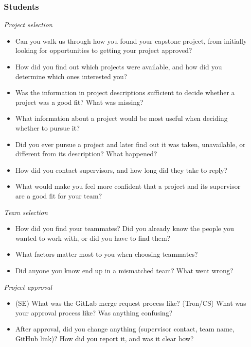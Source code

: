 \documentclass{article}
\begin{document}
    \subsubsection*{Students}
    \textit{Project selection}
    \begin{itemize}
        \item Can you walk us through how you found your capstone project, from initially looking for opportunities to getting your project approved?
        \item How did you find out which projects were available, and how did you determine which ones interested you?
        \item Was the information in project descriptions sufficient to decide whether a project was a good fit? What was missing?
        \item What information about a project would be most useful when deciding whether to pursue it?
        \item Did you ever pursue a project and later find out it was taken, unavailable, or different from its description? What happened?
        \item How did you contact supervisors, and how long did they take to reply?
        \item What would make you feel more confident that a project and its supervisor are a good fit for your team?
    \end{itemize}
    \textit{Team selection}
    \begin{itemize}
        \item How did you find your teammates? Did you already know the people you wanted to work with, or did you have to find them?
        \item What factors matter most to you when choosing teammates?
        \item Did anyone you know end up in a mismatched team? What went wrong?
    \end{itemize}
    \textit{Project approval}
    \begin{itemize}
        \item (SE) What was the GitLab merge request process like? (Tron/CS) What was your approval process like? Was anything confusing?
        \item After approval, did you change anything (supervisor contact, team name, GitHub link)? How did you report it, and was it clear how?
    \end{itemize}
\end{document}
